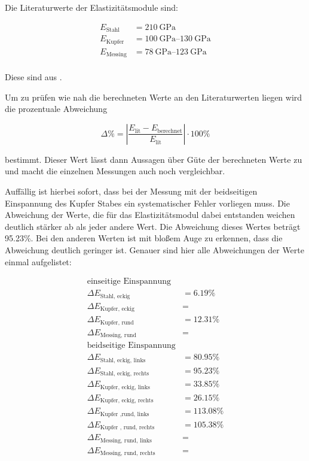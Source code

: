 \noindent Die Literaturwerte der Elastizitätsmodule sind: 

\begin{align*}
    E_\text{Stahl} &= \SI{210}{\giga\pascal} \\
    E_\text{Kupfer} &= \SIrange[range-units=brackets, range-phrase=-]{100}{130}{\giga\pascal} \\
    E_\text{Messing} &= \SIrange[range-units=brackets, range-phrase=-]{78}{123}{\giga\pascal} \\
\end{align*}

\noindent Diese sind aus \cite{E-Modul}.

\noindent Um zu prüfen wie nah die berechneten Werte an den Literaturwerten liegen wird die prozentuale Abweichung 

\begin{equation*}
    \Delta \% = \left\lvert\frac{E_\text{lit}-E_\text{berechnet}}{E_\text{lit}}\right\rvert \cdot 100\%
\end{equation*}

\noindent bestimmt. Dieser Wert lässt dann Aussagen über Güte der berechneten Werte zu und macht die einzelnen Messungen auch noch vergleichbar.

\noindent Auffällig ist hierbei sofort, dass bei der Messung mit der beidseitigen Einspannung des Kupfer Stabes ein systematischer Fehler vorliegen muss. Die Abweichung der Werte, die für das Elastizitätsmodul dabei entstanden weichen deutlich stärker ab als jeder andere Wert. Die Abweichung dieses Wertes beträgt 95.23\%. Bei den anderen Werten ist mit bloßem Auge zu erkennen, dass die Abweichung deutlich geringer ist. Genauer sind hier alle Abweichungen der Werte einmal aufgelistet:

\begin{align*}
    \text{einseitige Einspannung}\\
    \Delta E_\text{Stahl, eckig} &= 6.19\% \\
    \Delta E_\text{Kupfer, eckig} &=  \\
    \Delta E_\text{Kupfer, rund} &= 12.31\% \\
    \Delta E_\text{Messing, rund} &=  \\
    \text{beidseitige Einspannung} \\
    \Delta E_\text{Stahl, eckig, links} &= 80.95\% \\
    \Delta E_\text{Stahl, eckig, rechts} &= 95.23\%\\
    \Delta E_\text{Kupfer, eckig, links} &= 33.85\%\\
    \Delta E_\text{Kupfer, eckig, rechts} &= 26.15\%\\
    \Delta E_\text{Kupfer ,rund, links} &= 113.08\%\\
    \Delta E_\text{Kupfer , rund, rechts} &= 105.38\%\\
    \Delta E_\text{Messing, rund, links} &= \\
    \Delta E_\text{Messing, rund, rechts} &= \\
\end{align*}

